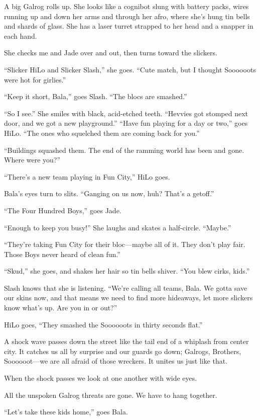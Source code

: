 A big Galrog rolls up. She looks like a cognibot slung with battery packs, wires running up and down her arms and through her afro, where she's hung tin bells and shards of glass. She has a laser turret strapped to her head and a snapper in each hand.

She checks me and Jade over and out, then turns toward the slickers.

``Slicker HiLo and Slicker Slash,'' she goes. ``Cute match, but I thought Soooooots were hot for girlies.''

``Keep it short, Bala,'' goes Slash. ``The blocs are smashed.''

``So I see.'' She smiles with black, acid-etched teeth. ``Hevvies got stomped next door, and we got a new playground.''
``Have fun playing for a day or two,'' goes HiLo. ``The ones who squelched them are coming back for you.''

``Buildings squashed them. The end of the ramming world has been and gone. Where were you?''

``There's a new team playing in Fun City,'' HiLo goes.

Bala's eyes turn to slits. ``Ganging on us now, huh? That's a getoff.''

``The Four Hundred Boys,'' goes Jade.

``Enough to keep you busy!'' She laughs and skates a half-circle. ``Maybe.''

``They're taking Fun City for their bloc—maybe all of it. They don't play fair. Those Boys never heard of clean fun.''

``Skud,'' she goes, and shakes her hair so tin bells shiver. ``You blew cirks, kids.''

Slash knows that she is listening. ``We're calling all teams, Bala. We gotta save our skins now, and that means we need to find more hideaways, let more slickers know what's up. Are you in or out?''

HiLo goes, ``They smashed the Soooooots in thirty seconds flat.''

A shock wave passes down the street like the tail end of a whiplash from center city. It catches us all by surprise and our guards go down; Galrogs, Brothers, Soooooot—we are all afraid of those wreckers. It unites us just like that.

When the shock passes we look at one another with wide eyes.

All the unspoken Galrog threats are gone. We have to hang together.

``Let's take these kids home,'' goes Bala.

